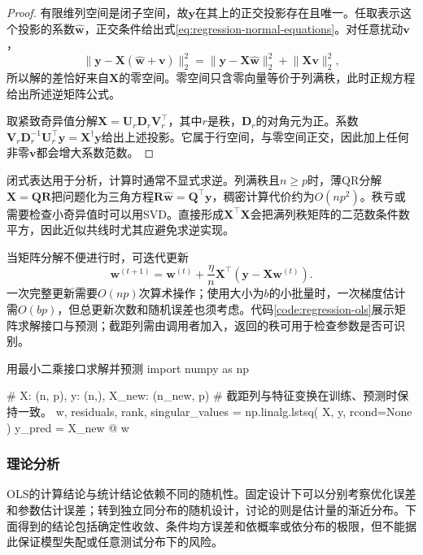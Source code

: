 \begin{proof}
有限维列空间是闭子空间，故$\bm{y}$在其上的正交投影存在且唯一。任取表示这个投影的系数$\widehat{\bm{w}}$，正交条件给出式\eqref{eq:regression-normal-equations}。对任意扰动$\bm{v}$，
\[
  \lVert\bm{y}-\bm{X}(\widehat{\bm{w}}+\bm{v})\rVert_2^2
  =\lVert\bm{y}-\bm{X}\widehat{\bm{w}}\rVert_2^2
    +\lVert\bm{X}\bm{v}\rVert_2^2,
\]
所以解的差恰好来自$\bm{X}$的零空间。零空间只含零向量等价于列满秩，此时正规方程给出所述逆矩阵公式。

取紧致奇异值分解$\bm{X}=\bm{U}_r\bm{D}_r\bm{V}_r^{\top}$，其中$r$是秩，$\bm{D}_r$的对角元为正。系数$\bm{V}_r\bm{D}_r^{-1}\bm{U}_r^{\top}\bm{y}=\bm{X}^{\dagger}\bm{y}$给出上述投影。它属于行空间，与零空间正交，因此加上任何非零$\bm{v}$都会增大系数范数。
\end{proof}

闭式表达用于分析，计算时通常不显式求逆。列满秩且$n\geq p$时，薄QR分解$\bm{X}=\bm{Q}\bm{R}$把问题化为三角方程$\bm{R}\widehat{\bm{w}}=\bm{Q}^{\top}\bm{y}$，稠密计算代价约为$O(np^2)$。秩亏或需要检查小奇异值时可以用SVD。直接形成$\bm{X}^{\top}\bm{X}$会把满列秩矩阵的二范数条件数平方，因此近似共线时尤其应避免求逆实现。

当矩阵分解不便进行时，可迭代更新
\begin{equation}
  \bm{w}^{(t+1)}
  =\bm{w}^{(t)}+\frac{\eta}{n}
       \bm{X}^{\top}(\bm{y}-\bm{X}\bm{w}^{(t)}).
  \label{eq:regression-ols-gradient}
\end{equation}
一次完整更新需要$O(np)$次算术操作；使用大小为$b$的小批量时，一次梯度估计需$O(bp)$，但总更新次数和随机误差也须考虑。代码\ref{code:regression-ols}展示矩阵求解接口与预测；截距列需由调用者加入，返回的秩可用于检查参数是否可识别。

\begin{codeblock}[language=Python,label={code:regression-ols},unbreakable]{用最小二乘接口求解并预测}
import numpy as np

# X: (n, p), y: (n,), X_new: (n_new, p)
# 截距列与特征变换在训练、预测时保持一致。
w, residuals, rank, singular_values = np.linalg.lstsq(
    X, y, rcond=None
)
y_pred = X_new @ w
\end{codeblock}

\subsubsection{理论分析}
\label{sec:regression-ols-theory}

OLS的计算结论与统计结论依赖不同的随机性。固定设计下可以分别考察优化误差和参数估计误差；转到独立同分布的随机设计，讨论的则是估计量的渐近分布。下面得到的结论包括确定性收敛、条件均方误差和依概率或依分布的极限，但不能据此保证模型失配或任意测试分布下的风险。

